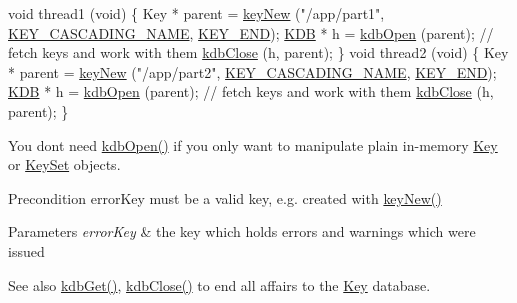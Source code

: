 \begin{DoxyCodeInclude}
\textcolor{keywordtype}{void} thread1 (\textcolor{keywordtype}{void})
\{
        Key * parent = \hyperlink{group__key_gad23c65b44bf48d773759e1f9a4d43b89}{keyNew} (\textcolor{stringliteral}{"/app/part1"}, \hyperlink{group__key_gga91fb3178848bd682000958089abbaf40afc1567f74444ff9c219f7456b652b4ec}{KEY\_CASCADING\_NAME}, 
      \hyperlink{group__key_gga91fb3178848bd682000958089abbaf40aa8adb6fcb92dec58fb19410eacfdd403}{KEY\_END});
        \hyperlink{classkdb_1_1KDB_a7e0637995ce9f294cdbc6f167df6db40}{KDB} * h = \hyperlink{group__kdb_ga6808defe5870f328dd17910aacbdc6ca}{kdbOpen} (parent);
        \textcolor{comment}{// fetch keys and work with them}
        \hyperlink{group__kdb_gadb54dc9fda17ee07deb9444df745c96f}{kdbClose} (h, parent);
\}
\textcolor{keywordtype}{void} thread2 (\textcolor{keywordtype}{void})
\{
        Key * parent = \hyperlink{group__key_gad23c65b44bf48d773759e1f9a4d43b89}{keyNew} (\textcolor{stringliteral}{"/app/part2"}, \hyperlink{group__key_gga91fb3178848bd682000958089abbaf40afc1567f74444ff9c219f7456b652b4ec}{KEY\_CASCADING\_NAME}, 
      \hyperlink{group__key_gga91fb3178848bd682000958089abbaf40aa8adb6fcb92dec58fb19410eacfdd403}{KEY\_END});
        \hyperlink{classkdb_1_1KDB_a7e0637995ce9f294cdbc6f167df6db40}{KDB} * h = \hyperlink{group__kdb_ga6808defe5870f328dd17910aacbdc6ca}{kdbOpen} (parent);
        \textcolor{comment}{// fetch keys and work with them}
        \hyperlink{group__kdb_gadb54dc9fda17ee07deb9444df745c96f}{kdbClose} (h, parent);
\}
\end{DoxyCodeInclude}
 You don\textquotesingle{}t need \hyperlink{group__kdb_ga6808defe5870f328dd17910aacbdc6ca}{kdb\+Open()} if you only want to manipulate plain in-\/memory \hyperlink{classkdb_1_1Key}{Key} or \hyperlink{classkdb_1_1KeySet}{Key\+Set} objects.

\begin{DoxyPrecond}{Precondition}
error\+Key must be a valid key, e.\+g. created with \hyperlink{group__key_gad23c65b44bf48d773759e1f9a4d43b89}{key\+New()}
\end{DoxyPrecond}

\begin{DoxyParams}{Parameters}
{\em error\+Key} & the key which holds errors and warnings which were issued \\
\hline
\end{DoxyParams}
\begin{DoxySeeAlso}{See also}
\hyperlink{group__kdb_ga28e385fd9cb7ccfe0b2f1ed2f62453a1}{kdb\+Get()}, \hyperlink{group__kdb_gadb54dc9fda17ee07deb9444df745c96f}{kdb\+Close()} to end all affairs to the \hyperlink{group__key}{Key} database. 
\end{DoxySeeAlso}

